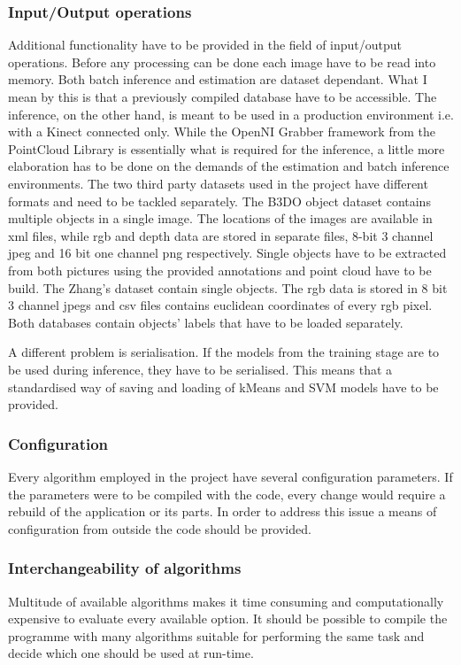 		\subsubsection{Input/Output operations}	
		Additional functionality have to be provided in the field of input/output operations. Before any processing can be done each image have to be read into memory. Both batch inference and estimation are dataset dependant. What I mean by this is that a previously compiled database have to be accessible. The inference, on the other hand, is meant to be used in a production environment i.e. with a Kinect connected only. While the OpenNI Grabber framework from the PointCloud Library is essentially what is required for the inference, a little more elaboration has to be done on the demands of the estimation and batch inference environments. The two third party datasets used in the project have different formats and need to be tackled separately. The B3DO object dataset contains multiple objects in a single image. The locations of the images are available in xml files, while rgb and depth data are stored in separate files, 8-bit 3 channel jpeg and 16 bit one channel png respectively. Single objects have to be extracted from both pictures using the provided annotations and point cloud have to be build. The Zhang's dataset contain single objects. The rgb data is stored in 8 bit 3 channel jpegs and csv files contains euclidean coordinates of every rgb pixel. Both databases contain objects' labels that have to be loaded separately.
		
		A different problem is serialisation. If the models from the training stage are to be used during inference, they have to be serialised. This means that a standardised way of saving and loading of kMeans and SVM models have to be provided.  
	
		\subsubsection{Configuration}		
		Every algorithm employed in the project have several configuration parameters. If the parameters were to be compiled with the code, every change would require a rebuild of the application or its parts. In order to address this issue a means of configuration from outside the code should be provided. 
		
		\subsubsection{Interchangeability of algorithms}		
		Multitude of available algorithms makes it time consuming and computationally expensive to evaluate every available option. It should be possible to compile the programme with many algorithms suitable for performing the same task and decide which one should be used at run-time.
		
